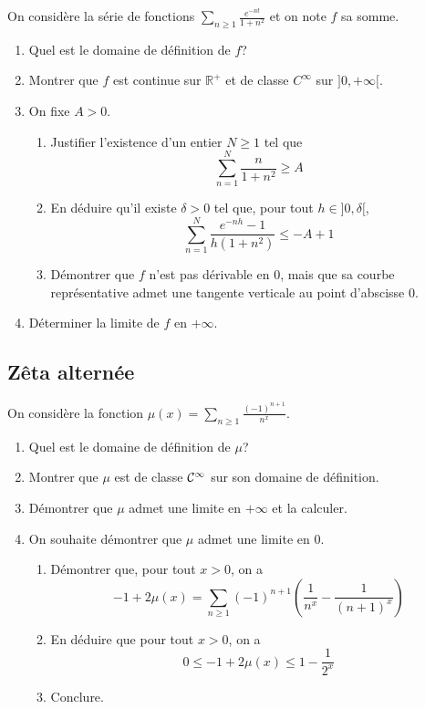 On considère la série de fonctions $\sum\limits_{n\geq 1}\frac{e^{-nt}}{1+n^2}$ et on note $f$ sa somme.
\begin{enumerate}
    \item Quel est le domaine de définition de $f$?
    \item Montrer que $f$ est continue sur $\mathbb R^+$ et de classe $C^\infty$ sur $]0,+\infty[$.
    \item On fixe $A>0$.
        \begin{enumerate}
            \item Justifier l'existence d'un entier $N\geq 1$ tel que 
                \[
                    \sum_{n=1}^N \frac{n}{1+n^2}\geqslant A
                \]
            \item En déduire qu'il existe $\delta>0$ tel que, pour tout $h\in]0,\delta[$, 
                \[
                    \sum_{n=1}^N \frac{e^{-nh}-1}{h(1+n^2)}\leqslant -A+1
                \]
            \item Démontrer que $f$ n'est pas dérivable en 0, mais que sa courbe représentative admet une tangente verticale au point d'abscisse 0.
        \end{enumerate}
    \item Déterminer la limite de $f$ en $+\infty$. 
\end{enumerate}

\subsection{Zêta alternée}


On considère la fonction $\mu(x)=\sum\limits_{n\geqslant 1}\frac{(-1)^{n+1}}{n^x}.$
\begin{enumerate}
    \item Quel est le domaine de définition de $\mu$?
    \item Montrer que $\mu$ est de classe $\mathcal{C}^\infty$ sur son domaine de définition.
    \item Démontrer que $\mu$ admet une limite en $+\infty$ et la calculer.
    \item On souhaite démontrer que $\mu$ admet une limite en 0.
        \begin{enumerate}
            \item Démontrer que, pour tout $x>0$, on a 
                \[
                    -1+2\mu(x)=\sum_{n\geqslant 1}(-1)^{n+1}\left(\frac{1}{n^x}-\frac{1}{(n+1)^x}\right)
                \]
            \item En déduire que pour tout $x>0$, on a
                \[
                    0\leqslant -1+2\mu(x)\leqslant 1-\frac{1}{2^x}
                \]
            \item Conclure.
        \end{enumerate}
\end{enumerate}


